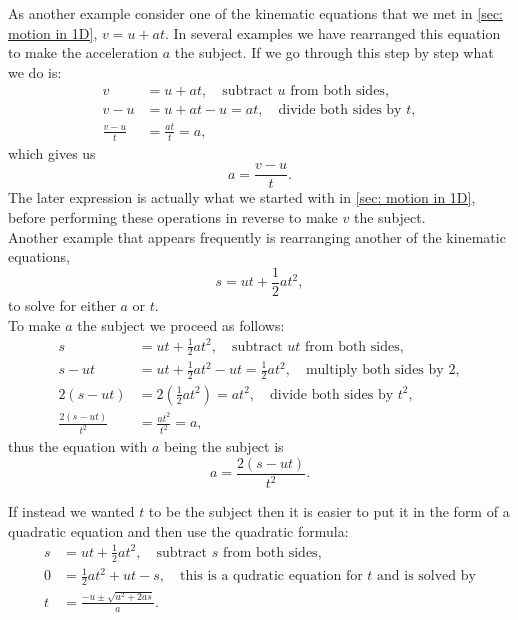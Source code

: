 \documentclass[a4paper,12pt]{book}
\begin{document}
As another example consider one of the kinematic equations that we met in \cref{sec: motion in 1D}, $v=u+at$. In several examples we have rearranged this equation to make the acceleration $a$ the subject. If we go through this step by step what we do is:
\begin{align*}
v&=u+at, \quad \text{subtract $u$ from both sides},\\
v-u&=u+at -u=at, \quad \text{divide both sides by $t$},\\
\frac{v-u}{t}&=\frac{at}{t}=a,
\end{align*}
which gives us
\begin{equation*}
a=\frac{v-u}{t}.
\end{equation*}
The later expression is actually what we started with in \cref{sec: motion in 1D}, before performing these operations in reverse to make $v$ the subject.\\

Another example that appears frequently is rearranging another of the kinematic equations,
\begin{equation*}
s=ut+\frac{1}{2}at^{2},
\end{equation*}
to solve for either $a$ or $t$.\\

To make $a$ the subject we proceed as follows:
\begin{align*}
s&=ut+\frac{1}{2}at^{2}, \quad \text{subtract $ut$ from both sides},\\
s-ut&=ut+\frac{1}{2}at^{2}-ut=\frac{1}{2}at^{2}, \quad \text{multiply both sides by $2$},\\
2\left(s-ut\right)&=2\left(\frac{1}{2}at^{2}\right)=at^{2}, \quad \text{divide both sides by $t^{2}$},\\
\frac{2\left(s-ut\right)}{t^{2}}&=\frac{at^{2}}{t^{2}}=a,
\end{align*}
thus the equation with $a$ being the subject is 
\begin{equation*}
a=\frac{2\left(s-ut\right)}{t^{2}}.
\end{equation*}

If instead we wanted $t$ to be the subject then it is easier to put it in the form of a quadratic equation and then use the quadratic formula:
\begin{align*}
s&=ut+\frac{1}{2}at^{2}, \quad \text{subtract $s$ from both sides},\\
0&=\frac{1}{2}at^{2}+ut-s,\quad \text{this is a qudratic equation for $t$ and is solved by}\\
t&=\frac{-u\pm\sqrt{u^{2}+2as}}{a}.
\end{align*}
\end{document}
